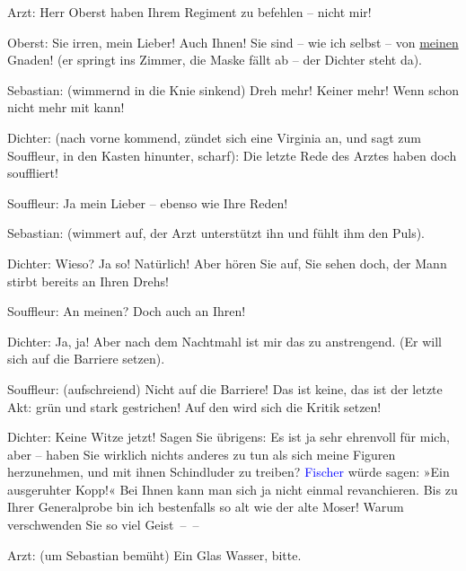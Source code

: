 \pstart
           Arzt: Herr Oberst haben Ihrem Regiment zu befehlen – nicht mir!\pend
           
\pstart
           Oberst: Sie irren, mein Lieber! Auch Ihnen! Sie sind – wie ich selbst – von \uline{meinen} Gnaden! (er springt ins Zimmer, die Maske fällt
               ab – der Dichter steht da).\pend
           
\pstart
           Sebastian: (wimmernd in die Knie sinkend)  Dreh mehr!
               Keiner mehr! Wenn  schon nicht mehr mit kann!\pend
           
\pstart
           Dichter: (nach vorne kommend, zündet sich eine Virginia an, und sagt zum Souffleur,
               in den Kasten hinunter, scharf): {\pb}Die letzte Rede des Arztes haben doch 
               souffliert!\pend
           
\pstart
           Souffleur: Ja mein Lieber – ebenso wie Ihre Reden!\pend
           
\pstart
           Sebastian: (wimmert auf, der Arzt unterstützt ihn und fühlt ihm den Puls).\pend
           
\pstart
           Dichter: Wieso? Ja so! Natürlich! Aber hören Sie auf, Sie sehen doch, der Mann stirbt
               bereits an Ihren Drehs!\pend
           
\pstart
           Souffleur: An meinen? Doch auch an Ihren!\pend
           
\pstart
           Dichter: Ja, ja! Aber nach dem Nachtmahl ist mir das zu anstrengend. (Er will sich
               auf die Barriere setzen).\pend
           
\pstart
           Souffleur: (aufschreiend) Nicht auf die Barriere! Das ist keine, das ist der letzte
               Akt: grün und stark gestrichen! Auf den wird sich die Kritik setzen!\pend
           
\pstart
           Dichter: Keine Witze jetzt! Sagen Sie übrigens: Es ist ja sehr ehrenvoll für mich,
               aber – haben Sie wirklich nichts anderes zu tun als sich meine Figuren herzunehmen,
               und mit ihnen Schindluder zu treiben? \textcolor{blue}{Fischer}{}\ledrightnote{\textcolor{blue}{Samuel Fischer}}
               würde sagen: »Ein ausgeruhter Kopp!« Bei Ihnen kann man sich ja nicht einmal
               revanchieren. Bis zu Ihrer Generalprobe bin ich bestenfalls so alt wie der alte
               Moser! Warum verschwenden Sie so viel Geist – –\pend
           
\pstart
           Arzt: (um Sebastian bemüht) Ein Glas Wasser, bitte.\pend
           

